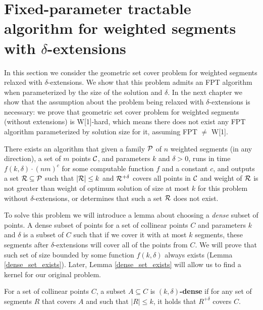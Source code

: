 \section{Fixed-parameter tractable algorithm for weighted segments with $\delta$-extensions}
\label{section:fpt_weighted}

In this section we consider the geometric set cover problem
for weighted segments relaxed with $\delta$-extensions.
We show that this problem
admits an FPT algorithm when parameterized by the size
of the solution and $\delta$.
In the next chapter we show that the assumption
about the problem being relaxed with $\delta$-extensions is necessary:
we prove that geometric set cover problem
for weighted segments (without extensions) is W[1]-hard, which means
there does not exist any FPT algorithm parameterized by solution size for it,
assuming FPT $\neq$ W[1].

\begin{tw}{
	\label{fpt_weighted_segment}
	There exists an algorithm that given a family $\mathcal{P}$ of
	$n$ weighted segments (in any direction),
	a set of $m$ points $\mathcal{C}$, and parameters $k$ and $\delta > 0$,
	runs in time $f(k, \delta) \cdot (nm)^c$ for some computable function $f$ and a constant $c$,
	and outputs a set $\mathcal{R} \subseteq \mathcal{P}$
	such that $|\mathcal{R}| \le k$ and $\mathcal{R}^{+\delta}$ covers all points in $\mathcal{C}$
	and weight of $\mathcal{R}$ is not greater than weight
	of optimum solution of size at most $k$
	for this problem without $\delta$-extensions,
	or determines that such a set $\mathcal{R}$ does not exist.
}\end{tw}


To solve this problem we will introduce a lemma about choosing
a \textit{dense} subset of points. A dense subset of points
for a set of collinear points $C$ and parameters $k$ and $\delta$
is a subset of $C$ such that
if we cover it with at most $k$ segments,
these segments after $\delta$-extensions will cover all of the points from $C$.
We will prove that such set 
of size bounded by some function $f(k, \delta)$
always exists (Lemma \ref{dense_set_exists}).
Later, Lemma \ref{dense_set_exists} will allow us to find a kernel
for our original problem.

\begin{defi}
	For a set of collinear points $C$,
	a subset $A \subseteq C$ is \textbf{$(k,\delta)$-dense} 
	if for any set of segments $R$ that covers $A$ and
	such that $|R| \le k$, it holds that $R^{+\delta}$ covers $C$.
\end{defi}

